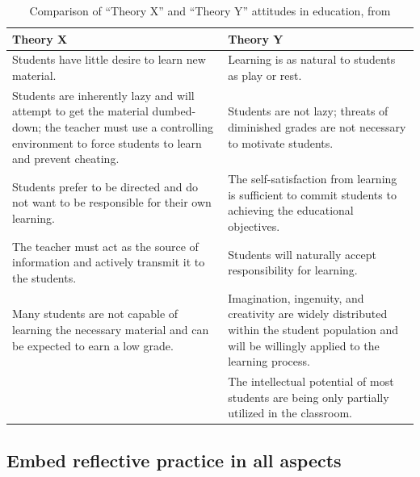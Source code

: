 \begin{landscape}
 \renewcommand{\arraystretch}{1.6}
 \begin{table}[htbp]
 	\caption{Comparison of ``Theory X'' and ``Theory Y'' attitudes in education, from \citet{Markwell:2004}}
 	\label{tbl:theoryx_y}

    \begin{tabular}{p{4in}|p{4in}}
    \textbf{Theory X} & \textbf{Theory Y} \\
    \hline
    Students have little desire to learn new material. & Learning is as natural to students as play or rest. \\
    Students are inherently lazy and will attempt to get the material dumbed-down; the teacher must use a controlling environment to force students to learn and prevent cheating. & Students are not lazy; threats of diminished grades are not necessary to motivate students. \\
    Students prefer to be directed and do not want to be responsible for their own learning. & The self-satisfaction from learning is sufficient to commit students to achieving the educational objectives. \\
    The teacher must act as the source of information and actively transmit it to the students. & Students will naturally accept responsibility for learning. \\
    Many students are not capable of learning the necessary material and can be expected to earn a low grade. & Imagination, ingenuity, and creativity are widely distributed within the student population and will be willingly applied to the learning process. \\
    ~ & The intellectual potential of most students are being only partially utilized in the classroom. \\
    \end{tabular}
 \end{table}
\end{landscape}


\subsection{Embed reflective practice in all aspects} %
\label{ssub:embed_reflective_practice_in_all_aspects}

